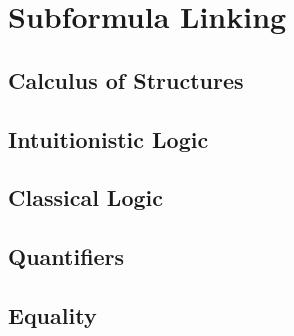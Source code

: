 \setchapterpreamble[u]{\margintoc}
\chapter{Subformula Linking}

\section{Calculus of Structures}

\section{Intuitionistic Logic}

\section{Classical Logic}

\section{Quantifiers}

\section{Equality}
